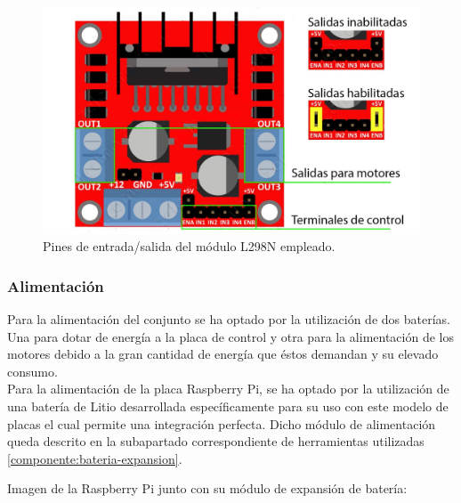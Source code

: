 \begin{figure}[H]
  \begin{center}
    \includegraphics[scale=2.5]{imagenes/L298N-conexiones.jpg}
  \end{center}
  \caption{Pines de entrada/salida del módulo L298N empleado.}
  \label{diagrama:L298N-salidas}
\end{figure}

\subsubsection{Alimentación}

Para la alimentación del conjunto se ha optado por la utilización de dos baterías. Una para dotar de energía a la placa de control y otra para la alimentación de los motores debido a la gran cantidad de energía 
que éstos demandan y su elevado consumo.\\

Para la alimentación de la placa Raspberry Pi, se ha optado por la utilización de una batería de Litio desarrollada específicamente para su uso con este modelo de placas el cual permite una integración
perfecta. Dicho módulo de alimentación queda descrito en la subapartado correspondiente de herramientas utilizadas \ref{componente:bateria-expansion}.

Imagen de la Raspberry Pi junto con su módulo de expansión de batería:

